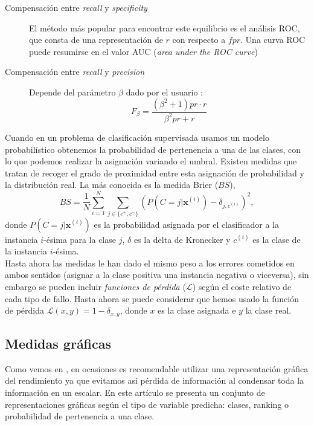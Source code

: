 	\begin{description}
		\item[Compensación entre \textit{recall} y \textit{specificity}] El método más popular para encontrar este equilibrio es el análisis ROC, que consta de una representación de $r$ con respecto a $fpr$. Una curva ROC puede resumirse en el valor AUC (\textit{area under the ROC curve})
		\item[Compensación entre \textit{recall} y \textit{precision}] Depende del parámetro $\beta$ dado por el usuario :
		\[ F_\beta = \frac{(\beta^2+1) pr \cdot r}
						  {\beta^2 pr + r}	\]
	\end{description}

	Cuando en un problema de clasificación supervisada usamos un modelo probabilístico obtenemos la probabilidad de pertenencia a una de las clases, con lo que podemos realizar la asignación variando el umbral. Existen medidas que tratan de recoger el grado de proximidad entre esta asignación de probabilidad y la distribución real. La más conocida es la medida Brier ($BS$),
	\[ BS = \frac{1}{N} \sum\limits_{i=1}^N 
		\sum\limits_{j \in \{c^+,c^-\}}
			\left( P \left( C=j|\mathbf{x}^{(i)} \right) -
			\delta_{j,c^{(i)}} \right) ^2,\]
	donde $P\left(C=j|\mathbf{x}^{(i)}\right)$ es la probabilidad asignada por el clasificador a la instancia $i$-ésima para la clase $j$, $\delta$ es la delta de Kronecker y $c^{(i)}$ es la clase de la instancia $i$-ésima.\\
	Hasta ahora las medidas le han dado el mismo peso a los errores cometidos en ambos sentidos (asignar a la clase positiva una instancia negativa o viceversa), sin embargo se pueden incluir \textit{funciones de pérdida} ($\mathcal{L}$) según el coste relativo de cada tipo de fallo. Hasta ahora se puede considerar que hemos usado la función de pérdida $\mathcal{L}(x,y) = 1 - \delta_{x,y} $, donde $x$ es la clase asignada e $y$ la clase real.
	
\subsection*{Medidas gráficas}

	Como vemos en \cite{PRATI11}, en ocasiones es recomendable utilizar una representación gráfica del rendimiento ya que evitamos así pérdida de información al condensar toda la información en un escalar. En este artículo se presenta un conjunto de representaciones gráficas según el tipo de variable predicha: clases, ranking o probabilidad de pertenencia a una clase.
	
